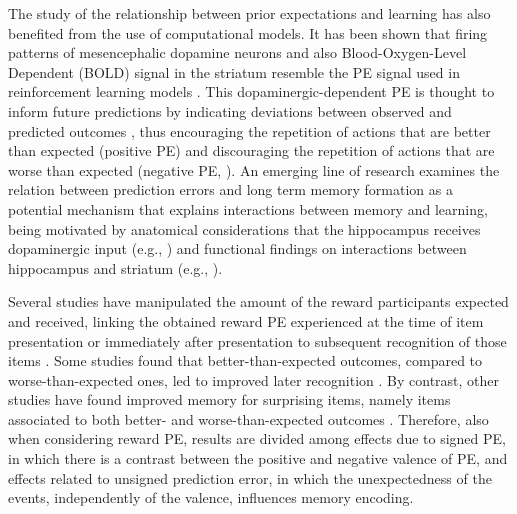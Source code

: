 \documentclass[a4paper,12pt]{article} 			%
\begin{document}
The study of the relationship between prior expectations and learning has also benefited from the use of computational models. It has been shown that firing patterns of mesencephalic dopamine neurons and also Blood-Oxygen-Level Dependent (BOLD) signal in the striatum resemble the PE signal used in reinforcement learning models \citep{Daw2011, Schultz1997, McClure2003}. This dopaminergic-dependent PE is thought to inform future predictions by indicating deviations between observed and predicted outcomes \citep{Daw2013, Niv2008, Rangel2008a, Rushworth2008}, thus encouraging the repetition of actions that are better than expected (positive PE) and discouraging the repetition of actions that are worse than expected (negative PE, \cite{Schultz2016, Steinberg2013}). An emerging line of research examines the relation between prediction errors and long term memory formation as a potential mechanism that explains interactions between memory and learning, being motivated by anatomical considerations that the hippocampus receives dopaminergic input (e.g., \cite{Lisman2005}) and functional findings on interactions between hippocampus and striatum (e.g., \cite{Poldrack2001}). \par
Several studies have manipulated the amount of the reward participants expected and received, linking the obtained reward PE experienced at the time of item presentation or immediately after presentation to subsequent recognition of those items \citep{Rouhani2018,Rouhani2021, Jang2019, de2018signed}. Some studies found that better-than-expected outcomes, compared to worse-than-expected ones, led to improved later recognition  \citep{Jang2019, de2018signed}⁠. By contrast, other studies have found improved memory for surprising items, namely items associated to both better- and worse-than-expected outcomes \citep{Rouhani2018, Rouhani2021}. Therefore, also when considering reward PE, results are divided among effects due to signed PE, in which there is a contrast between the positive and negative valence of PE, and effects related to unsigned prediction error, in which the unexpectedness of the events, independently of the valence, influences memory encoding.\par
\end{document}
